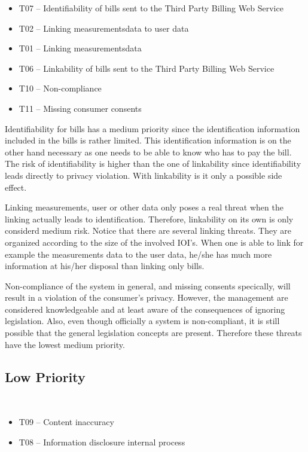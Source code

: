 \begin{itemize}
  \item T07 -- Identifiability of bills sent to the Third Party Billing
  Web Service
  \item T02 -- Linking measurementsdata to user data
  \item T01 -- Linking measurementsdata
  \item T06 -- Linkability of bills sent to the Third Party Billing Web
  Service 
  \item T10 -- Non-compliance
  \item T11 -- Missing consumer consents
\end{itemize}

\npar Identifiability for bills has a medium priority since the identification
information included in the bills is rather limited. This identification
information is on the other hand necessary as one needs to be able to know who
has to pay the bill. The risk of identifiability is higher than the one of
linkability since identifiability leads directly to privacy violation. With
linkability is it only a possible side effect.

\npar Linking measurements, user or other data only poses a real threat when the
linking actually leads to identification. Therefore, linkability on its own is
only considerd medium risk. Notice that there are several linking threats. They
are organized according to the size of the involved IOI's. When one is able to
link for example the measurements data to the user data, he/she has much more
information at his/her disposal than linking only bills.

\npar Non-compliance of the system in general, and missing consents specically,
will result in a violation of the consumer's privacy. However, the management
are considered knowledgeable and at least aware of the consequences of ignoring
legislation. Also, even though officially a system is non-compliant, it is still
possible that the general legislation concepts are present. Therefore these
threats have the lowest medium priority.

\subsection{Low Priority}

\ %

\begin{itemize}
  \item T09 -- Content inaccuracy
  \item T08 -- Information disclosure internal process
\end{itemize}

